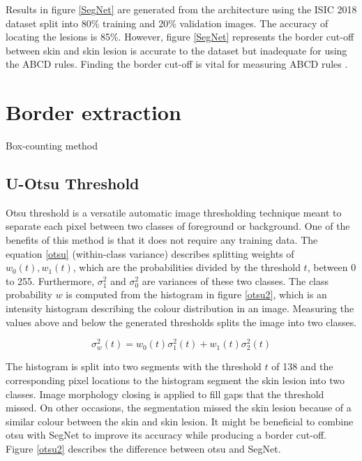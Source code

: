 Results in figure \ref{SegNet} are generated from the architecture using the ISIC 2018 dataset split into 80\% training and 20\% validation images. The accuracy of locating the lesions is 85\%. However, figure \ref{SegNet} represents the border cut-off between skin and skin lesion is accurate to the dataset but inadequate for using the ABCD rules. Finding the border cut-off is vital for measuring ABCD rules \cite{Pereira2020}.

\section{Border extraction}
Box-counting method

\subsection{U-Otsu Threshold}
Otsu threshold is a versatile automatic image thresholding technique meant to separate each pixel between two classes of foreground or background. One of the benefits of this method is that it does not require any training data. The equation \ref{otsu} (within-class variance) describes splitting weights of $w_0(t),w_1(t)$, which are the probabilities divided by the threshold $t$, between 0 to 255. Furthermore, $\sigma_1^2$ and $\sigma_0^2$ are variances of these two classes. The class probability $w$ is computed from the histogram in figure \ref{otsu2}, which is an intensity histogram describing the colour distribution in an image. Measuring the values above and below the generated thresholds splits the image into two classes.

\begin{equation} \label{otsu}
\sigma_w^2(t) = w_0(t)\sigma_1^2(t) + w_1(t)\sigma_2^2(t)
\end{equation}

The histogram is split into two segments with the threshold $t$ of 138 and the corresponding pixel locations to the histogram segment the skin lesion into two classes. Image morphology closing is applied to fill gaps that the threshold missed. On other occasions, the segmentation missed the skin lesion because of a similar colour between the skin and skin lesion. It might be beneficial to combine otsu with SegNet to improve its accuracy while producing a border cut-off. Figure \ref{otsu2} describes the difference between otsu and SegNet.

